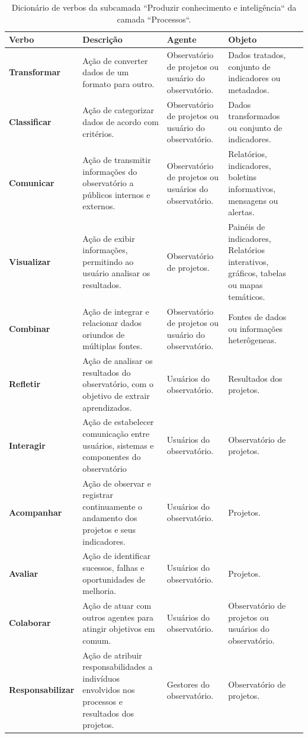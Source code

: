 \begin{apendicesenv}
\begin{table}[H]
\centering
\caption{Dicionário de verbos da subcamada ``Produzir conhecimento e inteligência`` da camada ``Processos``.}
\begin{tabularx}{\textwidth}{|l|X|X|X|X|}
\hline
\textbf{Verbo} & \textbf{Descrição} & \textbf{Agente} & \textbf{Objeto} \\ \hline
\textbf{Transformar} & Ação de converter dados de um formato para outro. & Observatório de projetos ou usuário do observatório. & Dados tratados, conjunto de indicadores ou metadados.\\ \hline
\textbf{Classificar} & Ação de categorizar dados de acordo com critérios. & Observatório de projetos ou usuário do observatório. & Dados transformados ou conjunto de indicadores.\\ \hline
\textbf{Comunicar} & Ação de transmitir informações do observatório a públicos internos e externos. & Observatório de projetos ou usuários do observatório. & Relatórios, indicadores, boletins informativos, mensagens ou alertas.\\ \hline
\textbf{Visualizar} & Ação de exibir informações, permitindo ao usuário analisar os resultados. & Observatório de projetos. & Painéis de indicadores, Relatórios interativos, gráficos, tabelas ou mapas temáticos.\\ \hline
\textbf{Combinar} & Ação de integrar e relacionar dados oriundos de múltiplas fontes. & Observatório de projetos ou usuário do observatório. & Fontes de dados ou informações heterôgeneas.\\ \hline
\textbf{Refletir} & Ação de analisar os resultados do observatório, com o objetivo de extrair aprendizados. & Usuários do observatório. & Resultados dos projetos.\\ \hline
\textbf{Interagir} & Ação de estabelecer comunicação entre usuários, sistemas e componentes do observatório & Usuários do observatório. & Observatório de projetos.\\ \hline
\textbf{Acompanhar} & Ação de observar e registrar continuamente o andamento dos projetos e seus indicadores. & Usuários do observatório. & Projetos.\\ \hline
\textbf{Avaliar} & Ação de identificar sucessos, falhas e oportunidades de melhoria. & Usuários do observatório. & Projetos.\\ \hline
\textbf{Colaborar} & Ação de atuar com outros agentes para atingir objetivos em comum. & Usuários do observatório. & Observatório de projetos ou usuários do observatório. \\ \hline
\textbf{Responsabilizar} & Ação de atribuir responsabilidades a indivíduos envolvidos nos processos e resultados dos projetos. & Gestores do observatório. & Observatório de projetos.\\ \hline
\end{tabularx}
\end{table}


\end{apendicesenv}
